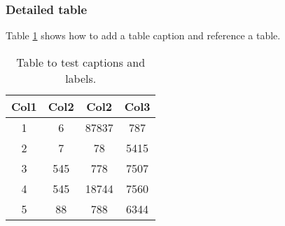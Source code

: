 \documentclass[12pt, letterpaper]{article}
\begin{document}
\subsubsection{Detailed table}
Table \ref{table:data} shows how to add a table caption and reference a table.
\begin{table}[h!]
\centering
\begin{tabular}{||c c c c||} 
 \hline
 Col1 & Col2 & Col2 & Col3 \\ [0.5ex] 
 \hline\hline
 1 & 6 & 87837 & 787 \\ 
 2 & 7 & 78 & 5415 \\
 3 & 545 & 778 & 7507 \\
 4 & 545 & 18744 & 7560 \\
 5 & 88 & 788 & 6344 \\ [1ex] 
 \hline
\end{tabular}
\caption{Table to test captions and labels.}
\label{table:data}
\end{table}
\end{document}
